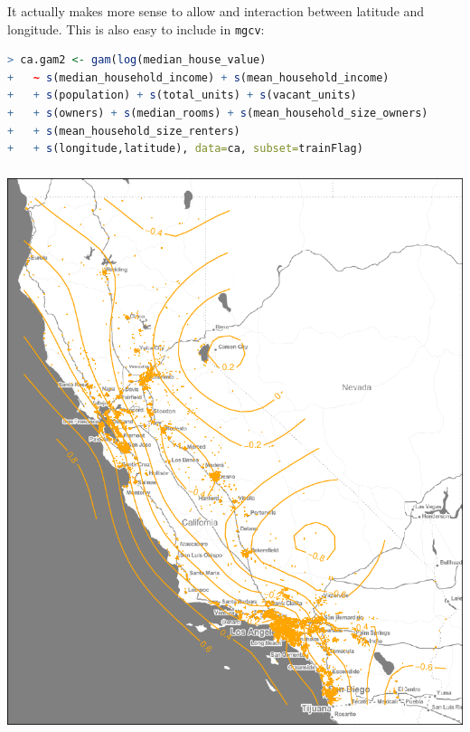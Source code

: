 \documentclass[xetex,mathserif,serif,aspectratio=169]{beamer}
\begin{document}
\begin{frame}[fragile] \frametitle{} \oldB \small

It actually makes more sense to allow and interaction between
latitude and longitude. This is also easy to include in \texttt{mgcv}:
\begin{lstlisting}[language=R, basicstyle=\fontsize{8pt}{10pt}\selectfont\ttfamily]
> ca.gam2 <- gam(log(median_house_value)
+   ~ s(median_household_income) + s(mean_household_income)
+   + s(population) + s(total_units) + s(vacant_units)
+   + s(owners) + s(median_rooms) + s(mean_household_size_owners)
+   + s(mean_household_size_renters)
+   + s(longitude,latitude), data=ca, subset=trainFlag)
\end{lstlisting}

\end{frame}

\begin{frame}[fragile] \frametitle{} \oldB \small

\begin{center}
\includegraphics[height=\textheight]{img/fig03.pdf}
\end{center}

\end{frame}
\end{document}
